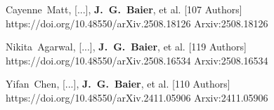          {Cayenne~{Matt}, [...], \textbf{J.~G.~{Baier}}, et al. [107 Authors]}
         {https://doi.org/10.48550/arXiv.2508.18126}
         {{Arxiv:}2508.18126}

         {Nikita~{Agarwal}, [...], \textbf{J.~G.~{Baier}}, et al. [119 Authors]}
         {https://doi.org/10.48550/arXiv.2508.16534}
         {{Arxiv:}2508.16534}

         {Yifan~{Chen}, [...], \textbf{J.~G.~{Baier}}, et al. [110 Authors]}
         {https://doi.org/10.48550/arXiv.2411.05906}
         {{Arxiv:}2411.05906}

